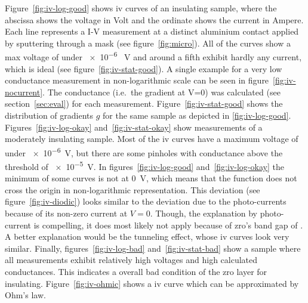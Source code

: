 Figure~\ref{fig:iv-log-good} shows \gls{iv} curves of an insulating sample, where the abscissa shows the voltage in Volt and the ordinate shows the current in Ampere. 
Each line represents a I-V measurement at a distinct aluminium contact applied by sputtering through a mask (see figure~\ref{fig:micro}).
All of the curves show a max voltage of under \num{e-6} \SI{}{\volt} 
and around a fifth exhibit hardly any current, which is ideal (see figure~\ref{fig:iv-stat-good}).
A single example for a very low conductance measurement in non-logarithmic scale can be seen in figure~\ref{fig:iv-nocurrent}.
The conductance (i.e.\ the gradient at V=0) was calculated (see section~\ref{sec:eval}) for each measurement.
Figure~\ref{fig:iv-stat-good} shows the distribution of gradients $g$ for the same sample as depicted in \ref{fig:iv-log-good}.
%
Figures~\ref{fig:iv-log-okay} and~\ref{fig:iv-stat-okay} show measurements of a moderately insulating sample. 
Most of the \gls{iv} curves have a maximum voltage of under \num{e-6}\SI{}{\volt}, 
but there are some pinholes with conductance above the threshold of \num{e-5}\SI{}{\volt}. %
%
In figures~\ref{fig:iv-log-good} and~\ref{fig:iv-log-okay} the minimum of some curves 
is not at \SI{0}{\volt}, which means that the function does not cross the origin in non-logarithmic representation. 
%
This deviation (see figure~\ref{fig:iv-diodic}) looks similar to the deviation due to the photo-currents\cite{perez2018solar} because of its non-zero current at $V=0$.
Though, the explanation by photo-current is compelling, it does most likely not apply because of \gls{zro}'s band gap of \cite{sinhamahapatra2016oxygen}.
A better explanation would be the tunneling effect, whose \gls{iv} curves look very similar\cite{feenstra1994scanning,datta1997current}.
%
Finally, figures~\ref{fig:iv-log-bad} and~\ref{fig:iv-stat-bad} show a sample 
where all measurements exhibit relatively high voltages and high calculated conductances. 
This indicates a overall bad condition of the \gls{zro} layer for insulating. 
Figure~\ref{fig:iv-ohmic} shows a \gls{iv} curve which can be approximated by Ohm's law. 
%

